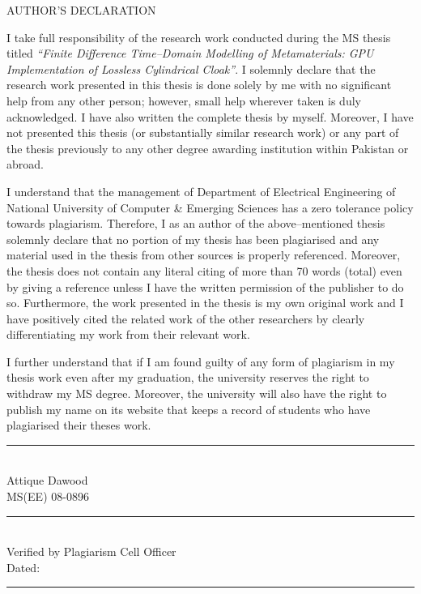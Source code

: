 \begin{center}
{AUTHOR'S DECLARATION}\\[0.5cm]
\end{center}

I take full responsibility of the research work conducted during the MS thesis titled \emph{``Finite Difference Time--Domain Modelling of Metamaterials: GPU Implementation of Lossless Cylindrical Cloak''}. I solemnly declare that the research work presented in this thesis is done solely by me with no significant help from any other person; however, small help wherever taken is duly acknowledged. I have also written the complete thesis by myself. Moreover, I have not presented this thesis (or substantially similar research work) or any part of the thesis previously to any other degree awarding institution within Pakistan or abroad.

I understand that the management of Department of Electrical Engineering of National University of Computer \& Emerging Sciences has a zero tolerance policy towards plagiarism. Therefore, I as an author of the above--mentioned thesis solemnly declare that no portion of my thesis has been plagiarised and any material used in the thesis from other sources is properly referenced. Moreover, the thesis does not contain any literal citing of more than 70 words (total) even by giving a reference unless I have the written permission of the publisher to do so. Furthermore, the work presented in the thesis is my own original work and I have positively cited the related work of the other researchers by clearly differentiating my work from their relevant work.

I further understand that if I am found guilty of any form of plagiarism in my thesis work even after my graduation, the university reserves the right to withdraw my MS degree. Moreover, the university will also have the right to publish my name on its website that keeps a record of students who have plagiarised their theses work.\\[0.1cm]
\begin{flushright}
\rule{5cm}{0.2mm}\\
Attique Dawood\\
MS(EE) 08-0896\\[1.2cm]
\rule{5cm}{0.2mm}\\
Verified by Plagiarism Cell Officer\\
Dated:~\rule{3cm}{0.2mm}\\[2cm]
\end{flushright}
